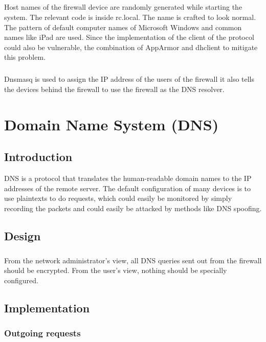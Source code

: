 \documentclass[mscthesis]{usiinfthesis}
\begin{document}
\paragraph{}
Host names of the firewall device are randomly generated while starting the system. The relevant code is inside rc.local. The name is crafted to look normal. The pattern of default computer names of Microsoft Windows and common names like iPad are used. Since the implementation of the client of the protocol could also be vulnerable, the combination of AppArmor and dhclient to mitigate this problem.
\paragraph{}
Dnsmasq is used to assign the IP address of the users of the firewall it also tells the devices behind the firewall to use the firewall as the DNS resolver.

\chapter{Domain Name System (DNS)}

\section{Introduction}
DNS is a protocol that translates the human-readable domain names to the IP addresses of the remote server. The default configuration of many devices is to use plaintexts to do requests, which could easily be monitored by simply recording the packets and could easily be attacked by methods like DNS spoofing.

\section{Design}
\paragraph{}
From the network administrator's view, all DNS queries sent out from the firewall should be encrypted. From the user's view, nothing should be specially configured.

\section{Implementation}
\subsection{Outgoing requests}
\end{document}
